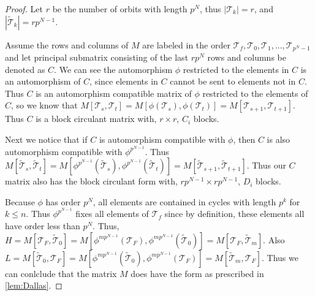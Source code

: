 \documentclass[preprint,12pt]{elsarticle}
\newcommand{\cT}{\mathcal{T}}
\newcommand{\tcT}{\tilde{\mathcal{T}}}
\theoremstyle{definition}
\theoremstyle{remark}
\begin{document}
\begin{proof}
Let $r$ be the number of orbits with length $p^N$, thus $|\cT_k|=r$, and $|\tcT_k|=rp^{N-1}$.

Assume the rows and columns of $M$ are labeled in the order $\cT_f,\cT_0,\cT_1,...,\cT_{p^N-1}$ and let principal submatrix consisting of the last $rp^N$ rows and columns be denoted as $C$.  We can see the automorphism $\phi$ restricted to the elements in $C$ is an automorphism of $C$, since elements in $C$ cannot be sent to elements not in $C$. Thus $C$ is an automorphism compatible matrix of $\phi$ restricted to the elements of $C$, so we know that $M[\cT_s,\cT_t]=M[\phi(\cT_s),\phi(\cT_t)]=M[\cT_{s+1},\cT_{t+1}]$.  Thus $C$ is a block circulant matrix with, $r\times r$, $C_i$ blocks.

Next we notice that if $C$ is automorphism compatible with $\phi$, then $C$ is also automorphism compatible with $\phi^{p^{N-1}}$. Thus $M[\tcT_s,\tcT_t]=M[\phi^{p^{N-1}}(\tcT_s),\phi^{p^{N-1}}(\tcT_t)]=M[\tcT_{s+1},\tcT_{t+1}]$.  Thus our $C$ matrix also has the block circulant form with, $rp^{N-1}\times rp^{N-1}$, $D_i$ blocks.

Because $\phi$ has order $p^N$, all elements are contained in cycles with length $p^k$ for $k\leq n$.  Thus $\phi^{p^{N-1}}$ fixes all elements of $\cT_f$ since by definition, these elements all have order less than $p^N$. Thus, $H=M[\cT_F,\tcT_0]=M[\phi^{mp^{N-1}}(\cT_F),\phi^{mp^{N-1}}(\tcT_0)]= M[\cT_F,\tcT_m].$ Also $L=M[\tcT_0,\cT_F]=M[\phi^{mp^{N-1}}(\tcT_0),\phi^{mp^{N-1}}(\cT_F)]= M[\tcT_m,\cT_F].$  Thus we can conlclude that the matrix $M$ does have the form as prescribed in \ref{lem:Dallas}.

\end{proof}
\end{document}
